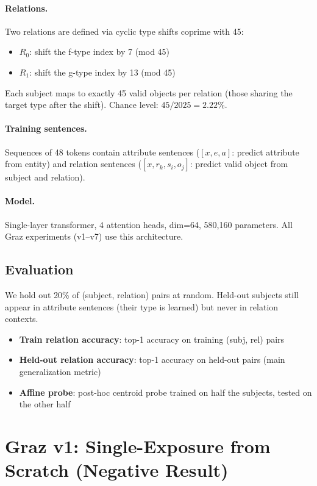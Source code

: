 \documentclass[11pt]{article}
\begin{document}
\paragraph{Relations.}
Two relations are defined via cyclic type shifts coprime with 45:
\begin{itemize}
\item $R_0$: shift the f-type index by 7 (mod 45)
\item $R_1$: shift the g-type index by 13 (mod 45)
\end{itemize}
Each subject maps to exactly 45 valid objects per relation (those sharing the target
type after the shift).  Chance level: $45/2025 = 2.22\%$.

\paragraph{Training sentences.}
Sequences of 48 tokens contain attribute sentences ($[x, e, a]$: predict attribute from
entity) and relation sentences ($[x, r_k, s_i, o_j]$: predict valid object from subject
and relation).

\paragraph{Model.}
Single-layer transformer, 4 attention heads, dim=64, 580,160 parameters.  All Graz
experiments (v1--v7) use this architecture.

\subsection{Evaluation}

We hold out 20\% of (subject, relation) pairs at random.  Held-out subjects still
appear in attribute sentences (their type is learned) but never in relation contexts.

\begin{itemize}
\item \textbf{Train relation accuracy}: top-1 accuracy on training (subj, rel) pairs
\item \textbf{Held-out relation accuracy}: top-1 accuracy on held-out pairs (main
  generalization metric)
\item \textbf{Affine probe}: post-hoc centroid probe trained on half the subjects,
  tested on the other half
\end{itemize}

\section{Graz v1: Single-Exposure from Scratch (Negative Result)}
\label{sec:v1}
\end{document}
